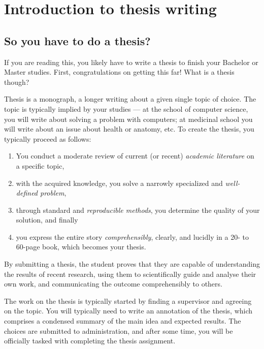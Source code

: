 \chapter{Introduction to thesis writing}
\label{chap:refs}

\section{So you have to do a thesis?}


If you are reading this, you likely have to write a thesis to finish your Bachelor or Master studies. First, congratulations on getting this far! What is a thesis though?

Thesis is a monograph, a longer writing about a given single topic of choice. The topic is typically implied by your studies --- at the school of computer science, you will write about solving a problem with computers; at medicinal school you will write about an issue about health or anatomy, etc. To create the thesis, you typically proceed as follows:
\begin{enumerate}
\item You conduct a moderate review of current (or recent) \emph{academic literature} on a specific topic,
\item with the acquired knowledge, you solve a narrowly specialized and \emph{well-defined problem},
\item through standard and \emph{reproducible methods}, you determine the quality of your solution, and finally\item you express the entire story \emph{comprehensibly}, clearly, and lucidly in a 20- to 60-page book, which becomes your thesis.
\end{enumerate}

By submitting a thesis, the student proves that they are capable of understanding the results of recent research, using them to scientifically guide and analyse their own work, and communicating the outcome comprehensibly to others.

The work on the thesis is typically started by finding a supervisor and agreeing on the topic. You will typically need to write an annotation of the thesis, which comprises a condensed summary of the main idea and expected results. The choices are submitted to administration, and after some time, you will be officially tasked with completing the thesis assignment.

